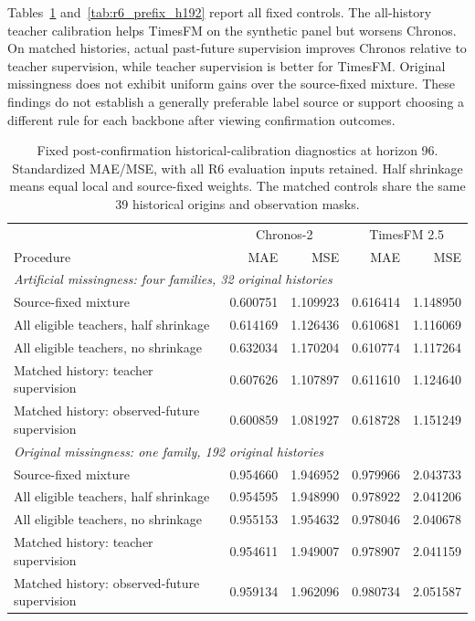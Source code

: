 Tables~\ref{tab:r6_prefix_h96} and~\ref{tab:r6_prefix_h192} report all fixed controls. The all-history teacher calibration helps TimesFM on the synthetic panel but worsens Chronos. On matched histories, actual past-future supervision improves Chronos relative to teacher supervision, while teacher supervision is better for TimesFM. Original missingness does not exhibit uniform gains over the source-fixed mixture. These findings do not establish a generally preferable label source or support choosing a different rule for each backbone after viewing confirmation outcomes.
\begin{table}[!htbp]
\caption{Fixed post-confirmation historical-calibration diagnostics at horizon 96. Standardized MAE/MSE, with all R6 evaluation inputs retained. Half shrinkage means equal local and source-fixed weights. The matched controls share the same 39 historical origins and observation masks.}
\label{tab:r6_prefix_h96}
\centering\small
\begin{tabular}{lrrrr}
\toprule
 & \multicolumn{2}{c}{Chronos-2} & \multicolumn{2}{c}{TimesFM 2.5}\\
Procedure & MAE & MSE & MAE & MSE\\
\midrule
\multicolumn{5}{l}{\textit{Artificial missingness: four families, 32 original histories}}\\
Source-fixed mixture & 0.600751 & 1.109923 & 0.616414 & 1.148950\\
All eligible teachers, half shrinkage & 0.614169 & 1.126436 & 0.610681 & 1.116069\\
All eligible teachers, no shrinkage & 0.632034 & 1.170204 & 0.610774 & 1.117264\\
Matched history: teacher supervision & 0.607626 & 1.107897 & 0.611610 & 1.124640\\
Matched history: observed-future supervision & 0.600859 & 1.081927 & 0.618728 & 1.151249\\
\midrule
\multicolumn{5}{l}{\textit{Original missingness: one family, 192 original histories}}\\
Source-fixed mixture & 0.954660 & 1.946952 & 0.979966 & 2.043733\\
All eligible teachers, half shrinkage & 0.954595 & 1.948990 & 0.978922 & 2.041206\\
All eligible teachers, no shrinkage & 0.955153 & 1.954632 & 0.978046 & 2.040678\\
Matched history: teacher supervision & 0.954611 & 1.949007 & 0.978907 & 2.041159\\
Matched history: observed-future supervision & 0.959134 & 1.962096 & 0.980734 & 2.051587\\
\bottomrule
\end{tabular}
\end{table}


